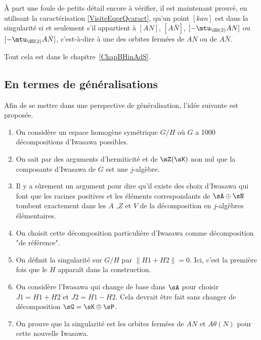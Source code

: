 À part une foule de petits détail encore à vérifier, il est maintenant prouvé, en utilisant la caractérisation \eqref{VisiteEqprQcaract}, qu'un point $[kan]$ est dans la singularité si et seulement s'il appartient à $[AN]$, $[A\bar N]$, $[-\mtu_{\SO(2)}AN]$ ou $[-\mtu_{\SO(2)}A\bar N]$, c'est-à-dire à une des orbites fermées de $AN$ ou de $A\bar N$.


Tout cela est dans le chapitre~\ref{ChapBHinAdS}.

\subsection{En termes de généralisations}

Afin de se mettre dans une perspective de généralisation, l'idée suivante est proposée.

\begin{enumerate}

	\item



	      On considère un espace homogène symétrique $G/H$ où $G$ a 1000 décompositions d'Iwasawa possibles.

	\item
	      On sait par des arguments d'hermiticité et de $\mZ(\sK)$ non nul que la composante d'Iwasawa de $G$ est une $j$-algèbre.

	\item
	      Il y a sûrement un argument pour dire qu'il existe des choix d'Iwasawa qui font que les racines positives et les éléments correspondants de $\sA\oplus\sN$ tombent exactement dans les $A$ ,$Z$ et $V $ de la décomposition en $j$-algèbres élémentaires.

	\item
	      On choisit cette décomposition particulière d'Iwasawa comme décomposition "de référence".

	\item
	      On définit la singularité sur $G/H$ par $\| H1+H2\|=0$. Ici, c'est la première fois que le $H$ apparaît dans la construction.

	\item
	      On considère l'Iwasawa qui change de base dans $\sA$ pour choisir $J1=H1+H2$ et $J2=H1-H2$. Cela devrait être fait sans changer de décomposition $\sG=\sK\oplus\sP$.

	\item		\label{ItemVGDern}
	      On prouve que la singularité est les orbites fermées de $AN$ et $A\theta(N)$ pour cette nouvelle Iwasawa.
\end{enumerate}


